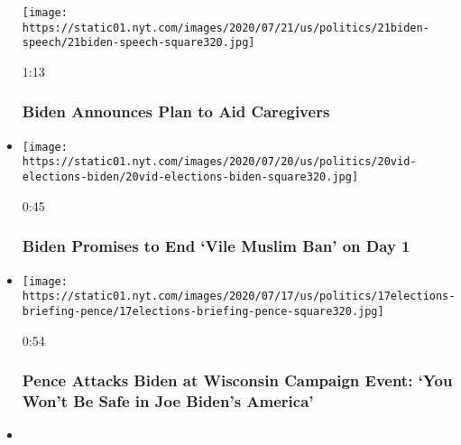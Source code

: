 \begin{itemize}
  \texttt{[image: https://static01.nyt.com/images/2020/07/21/us/politics/21biden-speech/21biden-speech-square320.jpg]}

  1:13

  \hypertarget{biden-announces-plan-to-aid-caregivers}{%
  \subsubsection{Biden Announces Plan to Aid
  Caregivers}\label{biden-announces-plan-to-aid-caregivers}}
\item
  \href{https://www.nytimes.com/video/us/100000007248132/biden-muslim-voters.html?action=click\&module=video-series-bar\&region=header\&pgtype=Article\&playlistId=video/2020-Elections}{}

  \texttt{[image: https://static01.nyt.com/images/2020/07/20/us/politics/20vid-elections-biden/20vid-elections-biden-square320.jpg]}

  0:45

  \hypertarget{biden-promises-to-end-vile-muslim-ban-on-day-1}{%
  \subsubsection{Biden Promises to End `Vile Muslim Ban' on Day
  1}\label{biden-promises-to-end-vile-muslim-ban-on-day-1}}
\item
  \href{https://www.nytimes.com/video/us/100000007244976/pence-calls-out-biden-wisconsin.html?action=click\&module=video-series-bar\&region=header\&pgtype=Article\&playlistId=video/2020-Elections}{}

  \texttt{[image: https://static01.nyt.com/images/2020/07/17/us/politics/17elections-briefing-pence/17elections-briefing-pence-square320.jpg]}

  0:54

  \hypertarget{pence-attacks-biden-at-wisconsin-campaign-event-you-wont-be-safe-in-joe-bidens-america}{%
  \subsubsection{Pence Attacks Biden at Wisconsin Campaign Event: `You
  Won't Be Safe in Joe Biden's
  America'}\label{pence-attacks-biden-at-wisconsin-campaign-event-you-wont-be-safe-in-joe-bidens-america}}
\item
  \href{https://www.nytimes.com/video/us/politics/100000007239700/jeff-sessions-alabama.html?action=click\&module=video-series-bar\&region=header\&pgtype=Article\&playlistId=video/2020-Elections}{}


\end{itemize}

